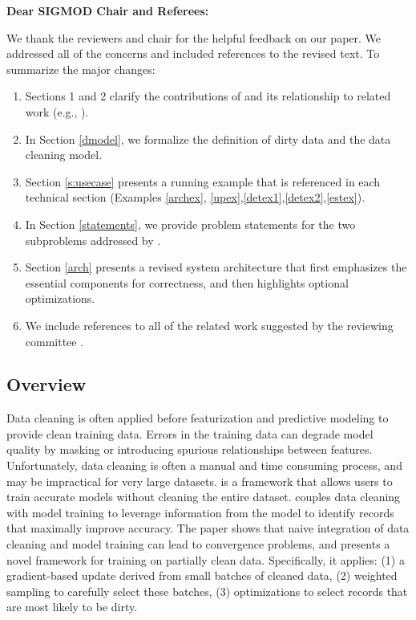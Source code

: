 {\noindent \normalsize \bf Dear SIGMOD Chair and Referees: }

\vspace{.5em}

We thank the reviewers and chair for the helpful feedback on our paper. 
We addressed all of the concerns and included references to the revised text. 
To summarize the major changes:

\begin{enumerate}
\item Sections 1 and 2 clarify the contributions of \sys and its relationship to related work (e.g., \cite{gokhale2014corleone, DBLP:journals/pvldb/YakoutENOI11, yakout2013don}).

\item In Section \ref{dmodel}, we formalize the definition of dirty data and the data cleaning model.

\item Section \ref{s:usecase} presents a running example that is referenced in each technical section (Examples \ref{archex}, \ref{upex},\ref{detex1},\ref{detex2},\ref{estex}).

\item In Section \ref{statements}, we provide problem statements for the two subproblems addressed by \sys.

\item Section \ref{arch} presents a revised system architecture that first emphasizes the essential components for correctness, and then highlights optional optimizations. 

\item We include references to all of the related work suggested by the reviewing committee \cite{whang2014incremental, papenbrock2015progressive, gruenheid2014incremental, DBLP:journals/pvldb/YakoutENOI11, yakout2013don, heise2014estimating}.
\end{enumerate}


\subsection*{Overview} 
Data cleaning is often applied before featurization and predictive modeling to provide clean training data.
Errors in the training data can degrade model quality by masking or introducing spurious relationships between features.
Unfortunately, data cleaning is often a manual and time consuming process, and may be impractical for very large datasets.
\sys is a framework that allows users to train accurate models without cleaning the entire dataset. 
\sys couples data cleaning with model training to leverage information from the model to identify records that maximally improve accuracy.
The paper shows that naive integration of data cleaning and model training can lead to convergence problems, and presents a novel framework for training on partially clean data.
Specifically, it applies: (1) a gradient-based update derived from small batches of cleaned data, (2) weighted sampling to carefully select these batches, (3) optimizations to select records that are most likely to be dirty.

